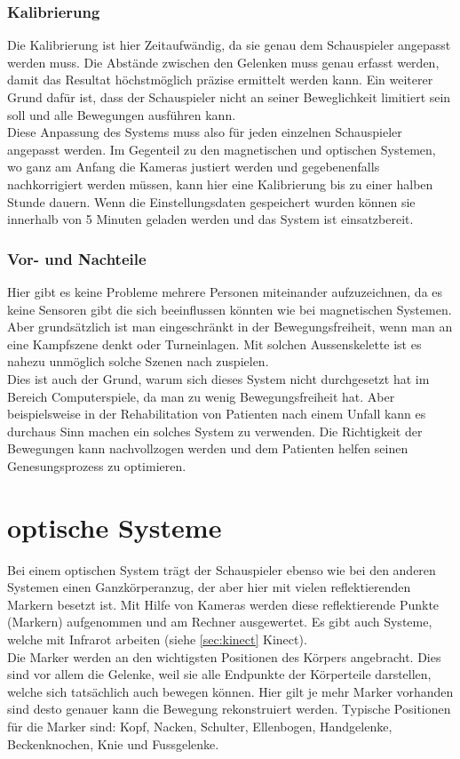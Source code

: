 \subsubsection{Kalibrierung}
Die Kalibrierung ist hier Zeitaufwändig, da sie genau dem Schauspieler angepasst werden muss. Die Abstände zwischen den Gelenken muss genau erfasst werden, damit das Resultat höchstmöglich präzise ermittelt werden kann. Ein weiterer Grund dafür ist, dass der Schauspieler nicht an seiner Beweglichkeit limitiert sein soll und alle Bewegungen ausführen kann. \\
Diese Anpassung des Systems muss also für jeden einzelnen Schauspieler angepasst werden. Im Gegenteil zu den magnetischen und optischen Systemen, wo ganz am Anfang die Kameras justiert werden und gegebenenfalls nachkorrigiert werden müssen, kann hier eine Kalibrierung bis zu einer halben Stunde dauern. Wenn die Einstellungsdaten gespeichert wurden können sie innerhalb von 5 Minuten geladen werden und das System ist einsatzbereit.

\subsubsection{Vor- und Nachteile}
 Hier gibt es keine Probleme mehrere Personen miteinander aufzuzeichnen, da es keine Sensoren gibt die sich beeinflussen könnten wie bei magnetischen Systemen. Aber grundsätzlich ist man eingeschränkt in der Bewegungsfreiheit, wenn man an eine Kampfszene denkt oder Turneinlagen. Mit solchen Aussenskelette ist es nahezu unmöglich solche Szenen nach zuspielen. \\
 Dies ist auch der Grund, warum sich dieses System nicht durchgesetzt hat im Bereich Computerspiele, da man zu wenig Bewegungsfreiheit hat. Aber beispielsweise in der Rehabilitation von Patienten nach einem Unfall kann es durchaus Sinn machen ein solches System zu verwenden. Die Richtigkeit der Bewegungen kann nachvollzogen werden und dem Patienten helfen seinen Genesungsprozess zu optimieren.

\section{optische Systeme}
\label{sec:optische_systeme}

Bei einem optischen System trägt der Schauspieler ebenso wie bei den anderen Systemen einen Ganzkörperanzug, der aber hier mit vielen reflektierenden Markern besetzt ist. Mit Hilfe von Kameras werden diese reflektierende Punkte (Markern) aufgenommen und am Rechner ausgewertet. Es gibt auch Systeme, welche mit Infrarot arbeiten (siehe \ref{sec:kinect} Kinect). \\
Die Marker werden an den wichtigsten Positionen des Körpers angebracht. Dies sind vor allem die Gelenke, weil sie alle Endpunkte der Körperteile darstellen, welche sich tatsächlich auch bewegen können. Hier gilt je mehr Marker vorhanden sind desto genauer kann die Bewegung rekonstruiert werden. Typische Positionen für die Marker sind: Kopf, Nacken, Schulter, Ellenbogen, Handgelenke, Beckenknochen, Knie und Fussgelenke.

